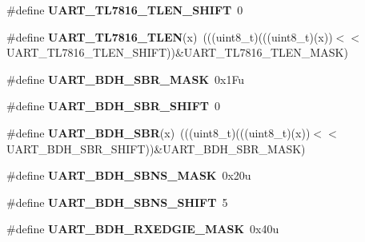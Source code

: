 \begin{DoxyCompactItemize}
\item 
\#define {\bfseries U\+A\+R\+T\+\_\+\+T\+L7816\+\_\+\+T\+L\+E\+N\+\_\+\+S\+H\+I\+FT}~0\hypertarget{group__UART__Register__Masks_gaafcee96c5728fbbbc56c3b2ea55bd753}{}\label{group__UART__Register__Masks_gaafcee96c5728fbbbc56c3b2ea55bd753}

\item 
\#define {\bfseries U\+A\+R\+T\+\_\+\+T\+L7816\+\_\+\+T\+L\+EN}(x)~(((uint8\+\_\+t)(((uint8\+\_\+t)(x))$<$$<$U\+A\+R\+T\+\_\+\+T\+L7816\+\_\+\+T\+L\+E\+N\+\_\+\+S\+H\+I\+FT))\&U\+A\+R\+T\+\_\+\+T\+L7816\+\_\+\+T\+L\+E\+N\+\_\+\+M\+A\+SK)\hypertarget{group__UART__Register__Masks_gaf537ccbe6ddd913ae8f3a988393519e4}{}\label{group__UART__Register__Masks_gaf537ccbe6ddd913ae8f3a988393519e4}

\item 
\#define {\bfseries U\+A\+R\+T\+\_\+\+B\+D\+H\+\_\+\+S\+B\+R\+\_\+\+M\+A\+SK}~0x1\+Fu\hypertarget{group__UART__Register__Masks_ga2680dc8176b0c933b4a1b77c5dbb64b7}{}\label{group__UART__Register__Masks_ga2680dc8176b0c933b4a1b77c5dbb64b7}

\item 
\#define {\bfseries U\+A\+R\+T\+\_\+\+B\+D\+H\+\_\+\+S\+B\+R\+\_\+\+S\+H\+I\+FT}~0\hypertarget{group__UART__Register__Masks_gac38d8a98be282d97c4837597a6c02cda}{}\label{group__UART__Register__Masks_gac38d8a98be282d97c4837597a6c02cda}

\item 
\#define {\bfseries U\+A\+R\+T\+\_\+\+B\+D\+H\+\_\+\+S\+BR}(x)~(((uint8\+\_\+t)(((uint8\+\_\+t)(x))$<$$<$U\+A\+R\+T\+\_\+\+B\+D\+H\+\_\+\+S\+B\+R\+\_\+\+S\+H\+I\+FT))\&U\+A\+R\+T\+\_\+\+B\+D\+H\+\_\+\+S\+B\+R\+\_\+\+M\+A\+SK)\hypertarget{group__UART__Register__Masks_ga7d337242135cdbd812b7da47758fbdb6}{}\label{group__UART__Register__Masks_ga7d337242135cdbd812b7da47758fbdb6}

\item 
\#define {\bfseries U\+A\+R\+T\+\_\+\+B\+D\+H\+\_\+\+S\+B\+N\+S\+\_\+\+M\+A\+SK}~0x20u\hypertarget{group__UART__Register__Masks_ga727c0ef3199f627c85fc740265d5134d}{}\label{group__UART__Register__Masks_ga727c0ef3199f627c85fc740265d5134d}

\item 
\#define {\bfseries U\+A\+R\+T\+\_\+\+B\+D\+H\+\_\+\+S\+B\+N\+S\+\_\+\+S\+H\+I\+FT}~5\hypertarget{group__UART__Register__Masks_ga4d6023b67150b98ef12dba445f773109}{}\label{group__UART__Register__Masks_ga4d6023b67150b98ef12dba445f773109}

\item 
\#define {\bfseries U\+A\+R\+T\+\_\+\+B\+D\+H\+\_\+\+R\+X\+E\+D\+G\+I\+E\+\_\+\+M\+A\+SK}~0x40u\hypertarget{group__UART__Register__Masks_ga0882debd8f2c52d4ab8461b22b6519d9}{}\label{group__UART__Register__Masks_ga0882debd8f2c52d4ab8461b22b6519d9}


\end{DoxyCompactItemize}
